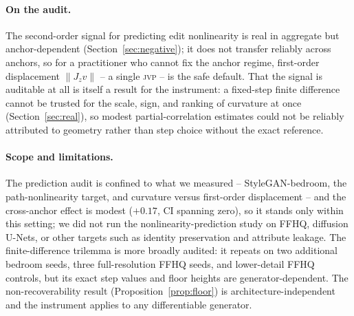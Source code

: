 \documentclass[10pt]{article}
\newcommand{\jvp}{\textsc{jvp}}
\begin{document}
\paragraph{On the audit.} The second-order signal for predicting edit nonlinearity is real in
aggregate but anchor-dependent (Section~\ref{sec:negative}); it does not transfer reliably across
anchors, so for a practitioner who cannot fix the anchor regime, first-order displacement
$\lVert J_z v\rVert$ -- a single \jvp{} -- is the safe default. That the signal is auditable at all
is itself a result for the instrument: a fixed-step finite difference cannot be trusted for the scale,
sign, and ranking of curvature at once (Section~\ref{sec:real}), so modest partial-correlation estimates
could not be reliably attributed to geometry rather than step choice without the exact reference.

\paragraph{Scope and limitations.} The prediction audit is confined to what we measured --
StyleGAN-bedroom, the path-nonlinearity target, and curvature versus first-order displacement -- and the
cross-anchor effect is modest ($+0.17$, CI spanning zero), so it stands only within this setting; we did
not run the nonlinearity-prediction study on FFHQ, diffusion U-Nets, or other targets such as identity
preservation and attribute leakage. The finite-difference trilemma is more broadly audited: it repeats on
two additional bedroom seeds, three full-resolution FFHQ seeds, and lower-detail FFHQ controls, but its
exact step values and floor heights are generator-dependent. The non-recoverability result
(Proposition~\ref{prop:floor}) is
architecture-independent and the instrument applies to any differentiable generator.
\end{document}
